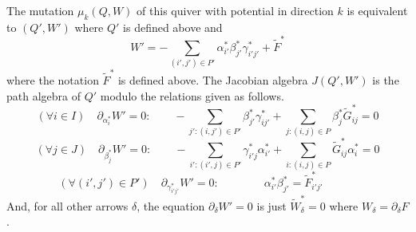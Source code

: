 \begin{prop}\label{prop: formula for mutation of W}  
The mutation $\mu_k(Q,W)$ of this quiver with potential in direction $k$ is equivalent to $(Q',W')$ where $Q'$ is defined above and
\[
	W'=-\sum_{(i',j')\in P'} \alpha_{i'}^\ast\beta_{j'}^\ast\gamma_{i'j'}^\ast+\widetilde F^\ast
\]
where the notation $\widetilde F^\ast$ is defined above. The Jacobian algebra $J(Q',W')$ is the path algebra of $Q'$ modulo the relations given as follows.
\[
	(\forall i\in I)\quad \partial_{\alpha_i^\ast}W'=0:\qquad -\sum_{j':(i,j')\in P'} \beta_{j'}^\ast\gamma_{ij'}^\ast +
	\sum_{j:(i,j)\in P}\beta_{j}^\ast \widetilde G_{ij}^\ast=0
\]
\[
	(\forall j\in J)\quad \partial_{\beta_j^\ast}W'=0:\qquad -\sum_{i': (i',j)\in P'} \gamma_{i'j}^\ast\alpha_{i'}^\ast+\sum_{i:(i,j)\in P} \widetilde G_{ij}^\ast\alpha_{i}^\ast =0
\]
\[
	(\forall (i',j')\in P')\quad \partial_{\gamma_{i'j'}^\ast}W'=0:\qquad\qquad \alpha_{i'}^\ast\beta_{j'}^\ast=\widetilde F_{i'j'}^\ast\qquad\quad 
\]
And, for all other arrows $\delta$, the equation $\partial_\delta W'=0$ is just $\widetilde W_\delta^\ast=0$ where $W_\delta=\partial_\delta  F$.
\end{prop}

